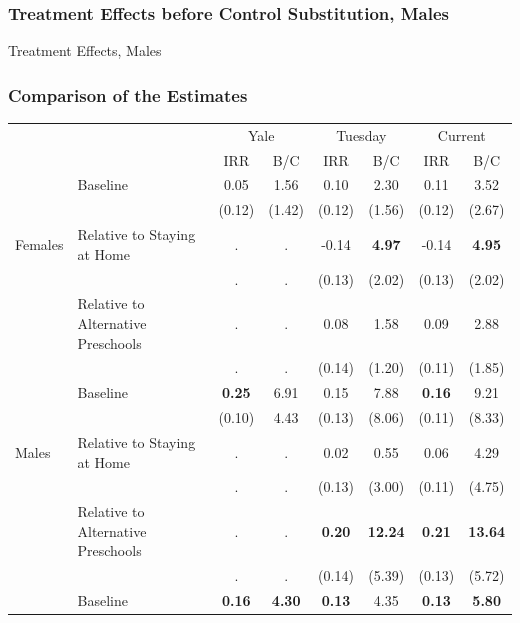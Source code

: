 \documentclass[static]{JJH-Beamer}
\begin{document}

\begin{frame}
\frametitle{Treatment Effects before Control Substitution, Males}
\begin{center}
\begin{table}
	\caption{Treatment Effects, Males} \label{tab:onsetsmales}
	\scalebox{.60}{}
\end{table}
\end{center}
\end{frame}


\begin{frame}[shrink=30]
\frametitle{Comparison of the Estimates}
\begin{tabular}{llcccccc}
											   && \multicolumn{2}{c}{Yale}&\multicolumn{2}{c}{Tuesday}&\multicolumn{2}{c}{Current}	\\
		&										& IRR	& B/C	& IRR	& B/C	& IRR	& B/C			\\
		& Baseline								& 0.05 	& 1.56	& 0.10	& 2.30	& 0.11	& 3.52			\\
		&										& (0.12)& (1.42)& (0.12)& (1.56)& (0.12)& (2.67)		\\
Females & Relative to Staying at Home			& 	.	& 	.	&-0.14&\textbf{4.97}		& -0.14	& \textbf{4.95}	\\
		&										&	.	&	.	&(0.13)	&(2.02)	& (0.13)& (2.02)		\\
		& Relative to Alternative Preschools	&   .	&   .	&0.08	&1.58		& 0.09	& 2.88			\\
		&										&	.	&	.	&(0.14)	&(1.20)	& (0.11)& (1.85)		\\ \hline
		& Baseline								& \textbf{0.25} & 6.91	& 0.15&7.88& \textbf{0.16}	& 9.21	\\
		&										& (0.10)& 4.43	& (0.13)&(8.06)	& (0.11)& (8.33)		\\ 
Males 	& Relative to Staying at Home			& 	.	& 	.	&0.02	&0.55	& 0.06	& 4.29 			\\
		&										&	.	&	.	&(0.13)&(3.00)& (0.11)& (4.75) 		\\ 
		& Relative to Alternative Preschools	& .	& .	&\textbf{0.20}&\textbf{12.24}& \textbf{0.21}& \textbf{13.64}\\
		&										&	.	&	.	&(0.14)		&(5.39)		& (0.13)& (5.72)			\\ \hline
		& Baseline						& \textbf{0.16} & \textbf{4.30}& \textbf{0.13}&4.35 & \textbf{0.13}	& \textbf{5.80} \\

\end{tabular}
\end{frame}
\end{document}
